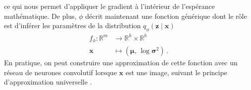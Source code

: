 ce qui nous permet d'appliquer le gradient à l'intérieur de l'espérance mathématique.
De plus, $\phi$ décrit maintenant une fonction générique dont le rôle est d'inférer les 
paramètres de la distribution $q_\phi(\mathbf{z} \mid \mathbf{x})$
\begin{equation}
        \begin{aligned}
                f_\phi: \mathbb{R}^{m} &\rightarrow \mathbb{R}^{h} \times \mathbb{R}^{h}\\ \mathbf{x} &\mapsto (\boldsymbol{\mu},\, \log \boldsymbol{\sigma}^{2})\, .
        \end{aligned}
\end{equation} 
En pratique, on peut construire une approximation de 
cette fonction avec un réseau de neurones convolutif lorsque $\mathbf{x}$ est une image, 
suivant le principe d'approximation universelle \citep{Cybenko1989,Hornik1991}. 

